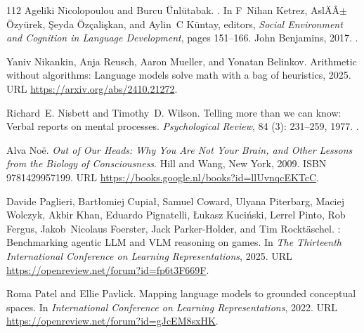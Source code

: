 \begin{thebibliography}{112}
Ageliki Nicolopoulou and Burcu {\"U}nl{\"u}tabak.
.
\newblock In F~Nihan Ketrez, Asl{\"A}{\^A}$\pm$ {\"O}zy{\"u}rek, {\c{S}}eyda {\"O}z{\c{c}}ali{\c{s}}kan, and Aylin~C K{\"u}ntay, editors, \emph{Social Environment and Cognition in Language Development}, pages 151--166. John Benjamins, 2017.
\newblock {}.

Yaniv Nikankin, Anja Reusch, Aaron Mueller, and Yonatan Belinkov.
\newblock Arithmetic without algorithms: Language models solve math with a bag of heuristics, 2025.
\newblock URL \url{https://arxiv.org/abs/2410.21272}.

Richard~E. Nisbett and Timothy~D. Wilson.
\newblock Telling more than we can know: Verbal reports on mental processes.
\newblock \emph{Psychological Review}, 84 (3): 231--259, 1977.
\newblock {}.

Alva No{\"e}.
\newblock \emph{Out of Our Heads: Why You Are Not Your Brain, and Other Lessons from the Biology of Consciousness}.
\newblock Hill and Wang, New York, 2009.
\newblock ISBN 9781429957199.
\newblock URL \url{https://books.google.nl/books?id=llUvnqcEKTcC}.

Davide Paglieri, Bart{\l}omiej Cupia{\l}, Samuel Coward, Ulyana Piterbarg, Maciej Wolczyk, Akbir Khan, Eduardo Pignatelli, {\L}ukasz Kuci{\'n}ski, Lerrel Pinto, Rob Fergus, Jakob~Nicolaus Foerster, Jack Parker-Holder, and Tim Rockt{\"a}schel.
: Benchmarking agentic {LLM} and {VLM} reasoning on games.
\newblock In \emph{The Thirteenth International Conference on Learning Representations}, 2025.
\newblock URL \url{https://openreview.net/forum?id=fp6t3F669F}.

Roma Patel and Ellie Pavlick.
\newblock Mapping language models to grounded conceptual spaces.
\newblock In \emph{International Conference on Learning Representations}, 2022.
\newblock URL \url{https://openreview.net/forum?id=gJcEM8sxHK}.


\end{thebibliography}

